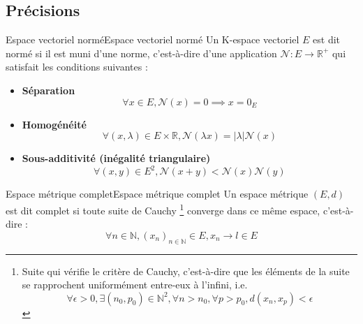\subsection{Précisions}
\begin{definition}{Espace vectoriel normé}{Espace vectoriel normé}
    Un K-espace vectoriel $E$ est dit normé si il est muni d'une norme, c'est-à-dire d'une application $\mathcal{N} : E \rightarrow \mathbb{R}^{+}$ qui satisfait les conditions suivantes :
    \begin{itemize}
        \item \textbf{Séparation}
        \begin{equation}
            \forall x \in E, \mathcal{N}(x)=0 \implies x = 0_{E}  
        \end{equation} 
        \item \textbf{Homogénéité}
        \begin{equation}
            \forall (x,\lambda) \in E \times \mathbb{R}, \mathcal{N}(\lambda x) = |\lambda|\mathcal{N}(x)
        \end{equation} 
        \item \textbf{Sous-additivité (inégalité triangulaire)}
        \begin{equation}
            \forall (x,y) \in E^{2}, \mathcal{N}(x+y) < \mathcal{N}(x)\mathcal{N}(y)
        \end{equation} 
    \end{itemize}
\end{definition}
\begin{definition}{Espace métrique complet}{Espace métrique complet}
    Un espace métrique $(E,d)$ est dit complet si toute suite de Cauchy \footnote{
        Suite qui vérifie le critère de Cauchy, c'est-à-dire que les éléments de la suite se rapprochent uniformément entre-eux à l'infini, i.e. 
        \begin{equation}
            \forall \epsilon > 0, \exists (n_{0},p_{0}) \in \mathbb{N}^{2}, \forall n > n_{0}, \forall p > p_{0}, d(x_{n}, x_{p}) < \epsilon   
        \end{equation}
     } 
     converge dans ce même espace, c'est-à-dire :
    \begin{equation}
        \forall n \in \mathbb{N}, (x_{n})_{n \in \mathbb{N}} \in E, x_{n} \longrightarrow l \in E
    \end{equation}
\end{definition}
